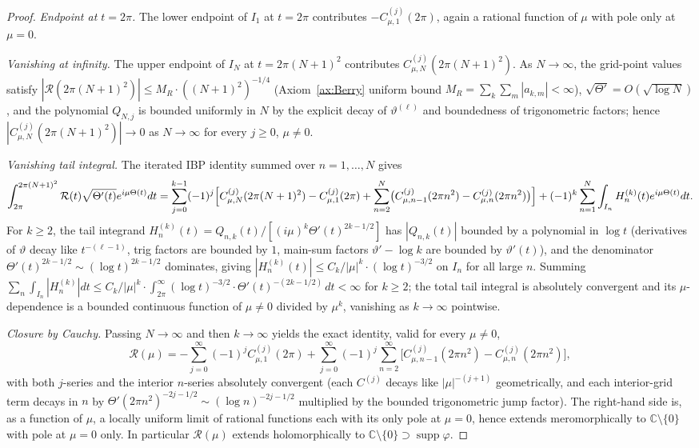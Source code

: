 \documentclass[11pt]{article}
\theoremstyle{definition}
\newcommand{\C}{\mathbb{C}}
\newcommand{\supp}{\operatorname{supp}}
\begin{document}
\begin{proof}
\emph{Endpoint at \(t=2\pi\).} The lower endpoint of \(I_1\) at \(t=2\pi\) contributes \(-C_{\mu,1}^{(j)}(2\pi)\), again a rational function of \(\mu\) with pole only at \(\mu=0\).

\emph{Vanishing at infinity.} The upper endpoint of \(I_N\) at \(t=2\pi(N+1)^2\) contributes \(C_{\mu,N}^{(j)}(2\pi(N+1)^2)\). As \(N\to\infty\), the grid-point values satisfy \(|\mathcal R(2\pi(N+1)^2)|\le M_R\cdot((N+1)^2)^{-1/4}\) (Axiom~\ref{ax:Berry} uniform bound \(M_R=\sum_k\sum_m|a_{k,m}|<\infty\)), \(\sqrt{\Theta'}=O(\sqrt{\log N})\), and the polynomial \(Q_{N,j}\) is bounded uniformly in \(N\) by the explicit decay of \(\vartheta^{(\ell)}\) and boundedness of trigonometric factors; hence \(|C_{\mu,N}^{(j)}(2\pi(N+1)^2)|\to 0\) as \(N\to\infty\) for every \(j\ge 0\), \(\mu\ne 0\).

\emph{Vanishing tail integral.} The iterated IBP identity summed over \(n=1,\ldots,N\) gives
\[
\int_{2\pi}^{2\pi(N+1)^2}\mathcal R(t)\sqrt{\Theta'(t)}e^{i\mu\Theta(t)}dt=\sum_{j=0}^{k-1}(-1)^j\Bigl[C_{\mu,N}^{(j)}(2\pi(N+1)^2)-C_{\mu,1}^{(j)}(2\pi)+\sum_{n=2}^{N}\bigl(C_{\mu,n-1}^{(j)}(2\pi n^2)-C_{\mu,n}^{(j)}(2\pi n^2)\bigr)\Bigr]+(-1)^k\sum_{n=1}^{N}\int_{I_n}H_n^{(k)}(t)e^{i\mu\Theta(t)}dt.
\]
For \(k\ge 2\), the tail integrand \(H_n^{(k)}(t)=Q_{n,k}(t)/[(i\mu)^k\Theta'(t)^{2k-1/2}]\) has \(|Q_{n,k}(t)|\) bounded by a polynomial in \(\log t\) (derivatives of \(\vartheta\) decay like \(t^{-(\ell-1)}\), trig factors are bounded by \(1\), main-sum factors \(\vartheta'-\log k\) are bounded by \(\vartheta'(t)\)), and the denominator \(\Theta'(t)^{2k-1/2}\sim(\log t)^{2k-1/2}\) dominates, giving \(|H_n^{(k)}(t)|\le C_k/|\mu|^k\cdot(\log t)^{-3/2}\) on \(I_n\) for all large \(n\). Summing \(\sum_n\int_{I_n}|H_n^{(k)}|dt\le C_k/|\mu|^k\cdot\int_{2\pi}^\infty(\log t)^{-3/2}\cdot\Theta'(t)^{-(2k-1/2)}\,dt<\infty\) for \(k\ge 2\); the total tail integral is absolutely convergent and its \(\mu\)-dependence is a bounded continuous function of \(\mu\ne 0\) divided by \(\mu^k\), vanishing as \(k\to\infty\) pointwise.

\emph{Closure by Cauchy.} Passing \(N\to\infty\) and then \(k\to\infty\) yields the exact identity, valid for every \(\mu\ne 0\),
\[
\mathcal R(\mu)=-\sum_{j=0}^{\infty}(-1)^j C_{\mu,1}^{(j)}(2\pi)+\sum_{j=0}^{\infty}(-1)^j\sum_{n=2}^\infty\bigl[C_{\mu,n-1}^{(j)}(2\pi n^2)-C_{\mu,n}^{(j)}(2\pi n^2)\bigr],
\]
with both \(j\)-series and the interior \(n\)-series absolutely convergent (each \(C^{(j)}\) decays like \(|\mu|^{-(j+1)}\) geometrically, and each interior-grid term decays in \(n\) by \(\Theta'(2\pi n^2)^{-2j-1/2}\sim(\log n)^{-2j-1/2}\) multiplied by the bounded trigonometric jump factor). The right-hand side is, as a function of \(\mu\), a locally uniform limit of rational functions each with its only pole at \(\mu=0\), hence extends meromorphically to \(\C\setminus\{0\}\) with pole at \(\mu=0\) only. In particular \(\mathcal R(\mu)\) extends holomorphically to \(\C\setminus\{0\}\supset\supp\varphi\).


\end{proof}
\end{document}

